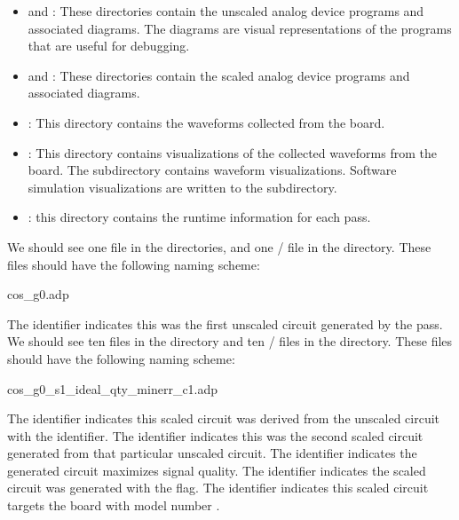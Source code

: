\begin{itemize}
\item{} and : These directories contain the
  unscaled analog device programs and associated diagrams. The diagrams are visual
  representations of the programs that are useful for debugging.
\item{} and : These directories contain the
  scaled analog device programs and associated diagrams. 
\item {}: This directory contains the waveforms collected from
  the \hcdc board.
\item {}: This directory contains visualizations of the collected
  waveforms from the \hcdc board. The  subdirectory contains \hcdc
  waveform visualizations. Software simulation visualizations are written
  to the  subdirectory. 
\item{}: this directory contains the runtime information for each
  pass.
\end{itemize}

We should see one  file in the 
directories, and one / file in the 
directory. These files should have the following naming scheme: 

\begin{snippet}
  cos_g0.adp
\end{snippet}

The  identifier indicates this was the first unscaled circuit generated
by the  pass. We should see ten  files in the
 directory and ten / files in the
 directory. These files should have the following naming scheme:

\begin{snippet}
  cos_g0_s1_ideal_qty_minerr_c1.adp 
\end{snippet}

The  identifier indicates this scaled circuit was derived from the
unscaled circuit with the  identifier. The  identifier indicates
this was the second scaled circuit generated from that particular unscaled
circuit. The  identifier indicates the generated circuit maximizes
signal quality. The  identifier indicates the scaled circuit was generated
with the  flag. The  identifier indicates this
scaled circuit targets the board with model number .



